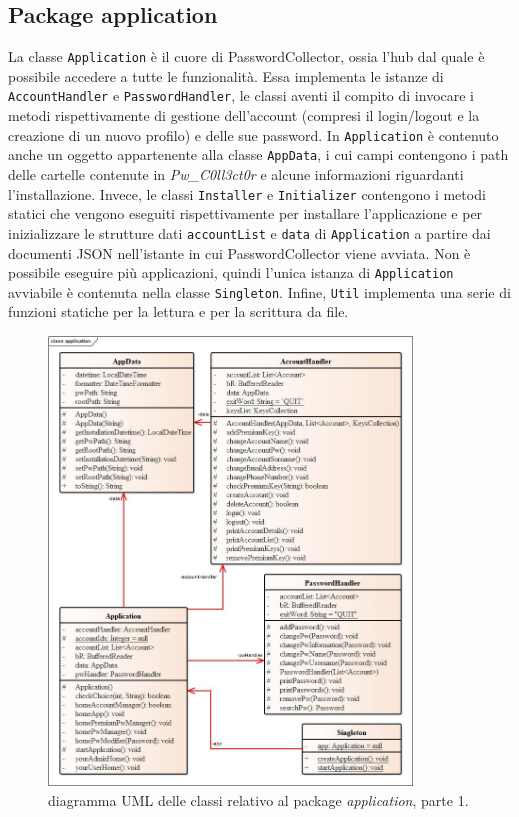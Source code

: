 \documentclass[a4paper, 12pt, one column, aas_macros]{article}
\begin{document}
	\subsection{Package application}
	La classe \verb|Application| è il cuore di PasswordCollector, ossia l'hub dal quale è possibile accedere a tutte le funzionalità. Essa implementa le istanze di \verb|AccountHandler| e \verb|PasswordHandler|, le classi aventi il compito di invocare i metodi rispettivamente di gestione dell'account (compresi il login/logout e la creazione di un nuovo profilo) e delle sue password. In \verb|Application| è contenuto anche un oggetto appartenente alla classe \verb|AppData|, i cui campi contengono i path delle cartelle contenute in \textit{Pw\_C0ll3ct0r} e alcune informazioni riguardanti l'installazione. Invece, le classi \verb|Installer| e \verb|Initializer| contengono i metodi statici che vengono eseguiti rispettivamente per installare l'applicazione e per inizializzare le strutture dati \verb|accountList| e \verb|data| di \verb|Application| a partire dai documenti JSON nell'istante in cui PasswordCollector viene avviata. Non è possibile eseguire più applicazioni, quindi l'unica istanza di \verb|Application| avviabile è contenuta nella classe \verb|Singleton|. Infine, \verb|Util| implementa una serie di funzioni statiche per la lettura e per la scrittura da file.
	\begin{figure}[h!]
		\centering
		\includegraphics[height=450px]{UML/application1.jpg}
		\caption{diagramma UML delle classi relativo al package \textit{application}, parte \num{1}.}
		\label{UML_application_1}
	\end{figure}
\end{document}
